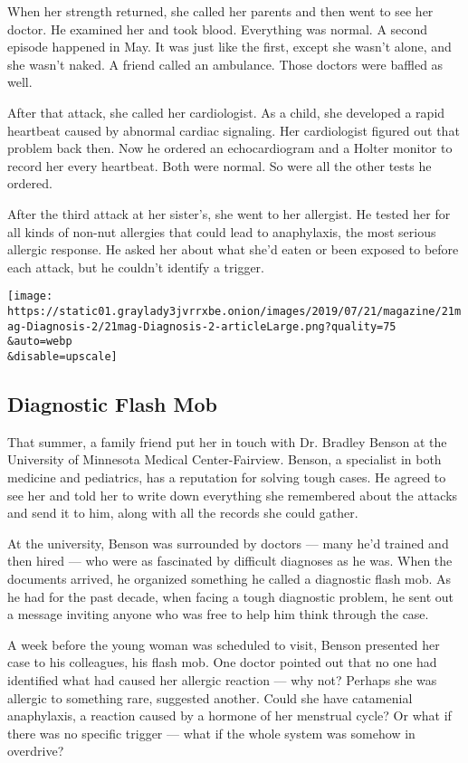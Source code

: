 When her strength returned, she called her parents and then went to see
her doctor. He examined her and took blood. Everything was normal. A
second episode happened in May. It was just like the first, except she
wasn't alone, and she wasn't naked. A friend called an ambulance. Those
doctors were baffled as well.

After that attack, she called her cardiologist. As a child, she
developed a rapid heartbeat caused by abnormal cardiac signaling. Her
cardiologist figured out that problem back then. Now he ordered an
echocardiogram and a Holter monitor to record her every heartbeat. Both
were normal. So were all the other tests he ordered.

After the third attack at her sister's, she went to her allergist. He
tested her for all kinds of non-nut allergies that could lead to
anaphylaxis, the most serious allergic response. He asked her about what
she'd eaten or been exposed to before each attack, but he couldn't
identify a trigger.

\texttt{[image: https://static01.graylady3jvrrxbe.onion/images/2019/07/21/magazine/21mag-Diagnosis-2/21mag-Diagnosis-2-articleLarge.png?quality=75\\\&auto=webp\\\&disable=upscale]}

\hypertarget{diagnostic-flash-mob}{%
\subsection{\texorpdfstring{\textbf{Diagnostic Flash
Mob}}{Diagnostic Flash Mob}}\label{diagnostic-flash-mob}}

That summer, a family friend put her in touch with Dr. Bradley Benson at
the University of Minnesota Medical Center-Fairview. Benson, a
specialist in both medicine and pediatrics, has a reputation for solving
tough cases. He agreed to see her and told her to write down everything
she remembered about the attacks and send it to him, along with all the
records she could gather.

At the university, Benson was surrounded by doctors --- many he'd
trained and then hired --- who were as fascinated by difficult diagnoses
as he was. When the documents arrived, he organized something he called
a diagnostic flash mob. As he had for the past decade, when facing a
tough diagnostic problem, he sent out a message inviting anyone who was
free to help him think through the case.

A week before the young woman was scheduled to visit, Benson presented
her case to his colleagues, his flash mob. One doctor pointed out that
no one had identified what had caused her allergic reaction --- why not?
Perhaps she was allergic to something rare, suggested another. Could she
have catamenial anaphylaxis, a reaction caused by a hormone of her
menstrual cycle? Or what if there was no specific trigger --- what if
the whole system was somehow in overdrive?

